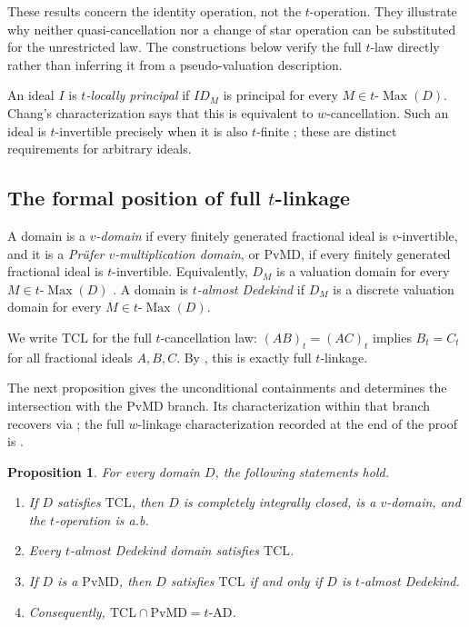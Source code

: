 \documentclass[11pt]{amsart}
\newtheorem{proposition}[proposition]{Proposition}
\theoremstyle{definition}
\theoremstyle{remark}
\newcommand{\PvMD}{\mathrm{PvMD}}
\newcommand{\TCL}{\mathrm{TCL}}
\newcommand{\tAD}{t\text{-}\mathrm{AD}}
\newcommand{\tMax}{t\text{-}\operatorname{Max}}
\begin{document}
These results concern the identity operation, not the $t$-operation.
They illustrate why neither quasi-cancellation nor a change of star
operation can be substituted for the unrestricted law.  The constructions
below verify the full $t$-law directly rather than inferring it from a
pseudo-valuation description.

An ideal $I$ is \emph{$t$-locally principal} if $ID_M$ is principal for
every $M\in\tMax(D)$.  Chang's characterization says that this is
equivalent to $w$-cancellation.  Such an ideal is $t$-invertible precisely
when it is also $t$-finite \cite{ChangCancellation}; these are distinct
requirements for arbitrary ideals.

\subsection{The formal position of full \texorpdfstring{$t$}{t}-linkage}

A domain is a \emph{$v$-domain} if every finitely generated fractional ideal
is $v$-invertible, and it is a \emph{Pr\"ufer $v$-multiplication domain}, or
$\PvMD$, if every finitely generated fractional ideal is $t$-invertible.
Equivalently, $D_M$ is a valuation domain for every $M\in\tMax(D)$
\cite{Griffin,Kang}.  A domain is \emph{$t$-almost Dedekind} if $D_M$ is a
discrete valuation domain for every $M\in\tMax(D)$.

We write $\TCL$ for the full $t$-cancellation law:
$(AB)_t=(AC)_t$ implies $B_t=C_t$ for all fractional ideals $A,B,C$.  By
, this is exactly full $t$-linkage.

The next proposition gives the unconditional containments and determines
the intersection with the $\PvMD$ branch.  Its characterization within
that branch recovers \cite[Corollary~3.4]{KabbajMimouniStar} via
; the full $w$-linkage characterization
recorded at the end of the proof is
\cite[Theorem~3.3]{KabbajMimouniStar}.

\begin{proposition}\label{prop:t-position}
For every domain $D$, the following statements hold.
\begin{enumerate}[label=\textup{(\roman*)}]
\item If $D$ satisfies $\TCL$, then $D$ is completely integrally closed, is
a $v$-domain, and the $t$-operation is a.b.
\item Every $t$-almost Dedekind domain satisfies $\TCL$.
\item If $D$ is a $\PvMD$, then $D$ satisfies $\TCL$ if and only if $D$ is
$t$-almost Dedekind.
\item Consequently, $\TCL\cap\PvMD=\tAD$.
\end{enumerate}
\end{proposition}
\end{document}
